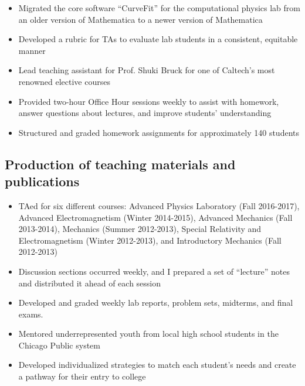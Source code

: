 \begin{itemize}
	\item Migrated the core software \enquote{CurveFit} for the computational physics lab from an older version of Mathematica to a newer version of Mathematica
	\item Developed a rubric for TAs to evaluate lab students in a consistent, equitable manner
\end{itemize}

\begin{itemize}
	\item Lead teaching assistant for Prof. Shuki Bruck for one of Caltech's most renowned elective courses
	\item Provided two-hour Office Hour sessions weekly to assist with homework, answer questions about lectures, and improve students' understanding
	\item Structured and graded homework assignments for approximately 140 students
\end{itemize}

\subsection{Production of teaching materials and publications}\label{ssec:production-of-teaching-materials-and-publications}

\begin{itemize}
	\item TAed for six different courses: Advanced Physics Laboratory (Fall 2016-2017), Advanced Electromagnetism (Winter 2014-2015), Advanced Mechanics (Fall 2013-2014), Mechanics (Summer 2012-2013), Special Relativity and Electromagnetism (Winter 2012-2013), and Introductory Mechanics (Fall 2012-2013)
	\item Discussion sections occurred weekly, and I prepared a set of \enquote{lecture} notes and distributed it ahead of each session
	\item Developed and graded weekly lab reports, problem sets, midterms, and final exams.
\end{itemize}

\begin{itemize}
	\item Mentored underrepresented youth from local high school students in the Chicago Public system
	\item Developed individualized strategies to match each student's needs and create a pathway for their entry to college
\end{itemize}

